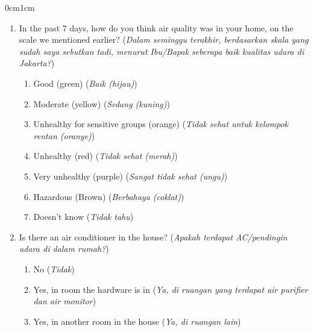 \documentclass[9pt,twoside,lineno]{pnas-new}
\begin{document}
\begin{adjustwidth}{0cm}{1cm}
\begin{enumerate}
    \item In the past 7 days, how do you think air quality was in your home, on the scale we mentioned earlier? (\textit{Dalam seminggu terakhir, berdasarkan skala yang sudah saya sebutkan tadi, menurut Ibu/Bapak seberapa baik kualitas udara di Jakarta?})

    \begin{enumerate}
        \item Good (green) (\textit{Baik (hijau)})
        \item Moderate (yellow) (\textit{Sedang (kuning)})
        \item Unhealthy for sensitive groups (orange) (\textit{Tidak sehat untuk kelompok rentan (oranye)})
        \item Unhealthy (red) (\textit{Tidak sehat (merah)})
        \item Very unhealthy (purple) (\textit{Sangat tidak sehat (ungu)})
        \item Hazardous (Brown) (\textit{Berbahaya (coklat)})
        \item Doesn't know (\textit{Tidak tahu})
    \end{enumerate}

    
    \item Is there an air conditioner in the house? (\textit{Apakah terdapat AC/pendingin udara di dalam rumah?})
    \begin{enumerate}
        \item No (\textit{Tidak})
        \item Yes, in room the hardware is in (\textit{Ya, di ruangan yang terdapat air purifier dan air monitor})
        \item Yes, in another room in the house (\textit{Ya, di ruangan lain})
    \end{enumerate}
     

\end{enumerate}
\end{adjustwidth}
\end{document}
